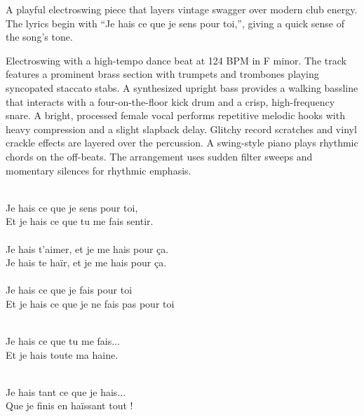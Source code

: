 

\begin{notes}
A playful electroswing piece that layers vintage swagger over modern club energy. %
The lyrics begin with “Je hais ce que je sens pour toi,”, giving a quick sense of the song’s tone.
\end{notes}

\begin{style}
Electroswing with a high-tempo dance beat at 124 BPM in F minor. %
The track features a prominent brass section with trumpets and trombones playing syncopated staccato stabs. %
A synthesized upright bass provides a walking bassline that interacts with a four-on-the-floor kick drum and a crisp, high-frequency snare. %
A bright, processed female vocal performs repetitive melodic hooks with heavy compression and a slight slapback delay. %
Glitchy record scratches and vinyl crackle effects are layered over the percussion. %
A swing-style piano plays rhythmic chords on the off-beats. %
The arrangement uses sudden filter sweeps and momentary silences for rhythmic emphasis.
\end{style}

\begin{lyrics}

\\
Je hais ce que je sens pour toi,\\
Et je hais ce que tu me fais sentir.\\
\\
Je hais t'aimer, et je me hais pour ça.\\
Je hais te haïr, et je me hais pour ça.\\
\\
Je hais ce que je fais pour toi\\
Et je hais ce que je ne fais pas pour toi

\\
Je hais ce que tu me fais...\\
Et je hais toute ma haine.

\\
Je hais tant ce que je hais...\\
Que je finis en haïssant tout !

\end{lyrics}

